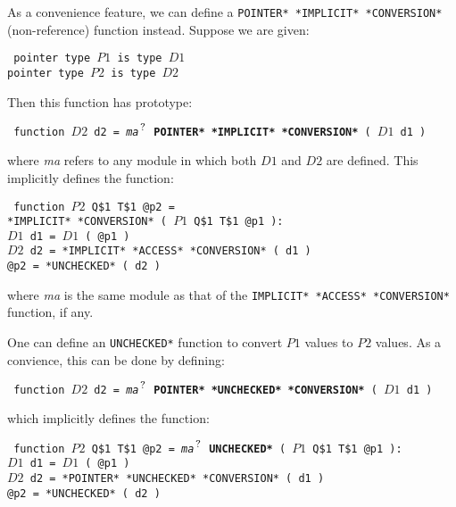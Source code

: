 \documentclass[12pt]{article}
\newcommand{\QMARK}{{$^{\,\mbox{\footnotesize ?}}$}}
\newcommand{\ttkey}[1]{{\tt \bfseries #1}}
\newenvironment{indpar}[1][0.3in]%
	{\begin{list}{}%
		     {\setlength{\itemsep}{0in}%
		      \setlength{\topsep}{0in}%
		      \setlength{\parsep}{1ex}%
		      \setlength{\labelwidth}{#1}%
		      \setlength{\leftmargin}{#1}%
		      \addtolength{\leftmargin}{\labelsep}}%
	 \item}%
	{\end{list}}
\begin{document}
As a convenience feature, we can define a
{\tt *POINTER* *IMPLICIT* *CONVERSION*} (non-reference) function instead.
 Suppose we are given:
\begin{indpar} \tt
pointer type $P1$ is type $D1$ \\
pointer type $P2$ is type $D2$
\end{indpar}
Then this function has prototype:
\begin{indpar}\label{POINTER-IMPLICIT-CONVERSION} \tt
function $D2$ d2 = {\em ma}\QMARK{} \ttkey{*POINTER* *IMPLICIT* *CONVERSION*}
                  ( $D1$ d1 )
\end{indpar}
where {\em ma} refers to any module in which both $D1$ and $D2$ are defined.
This implicitly defines the function:
\begin{indpar} \tt
function $P2$ Q\$1 T\$1 @p2 = \\
\hspace*{1in}{\em ma}\QMARK{} *IMPLICIT* *CONVERSION* ( $P1$ Q\$1 T\$1 @p1 ): \\
\hspace*{0.3in}$D1$ d1 = $D1$ ( @p1 ) \\
\hspace*{0.3in}$D2$ d2 = *IMPLICIT* *ACCESS* *CONVERSION* ( d1 ) \\
\hspace*{0.3in}@p2 = *UNCHECKED* ( d2 )
\end{indpar}
where {\em ma} is the same module as that of the
{\tt *IMPLICIT* *ACCESS* *CONVERSION*} function, if any.

One can define an {\tt *UNCHECKED*} function to convert
$P1$ values to $P2$ values.  As a convience, this can be
done by defining:
\begin{indpar} \tt
function $D2$ d2 = {\em ma}\QMARK{}  \ttkey{*POINTER* *UNCHECKED* *CONVERSION*}
			( $D1$ d1 )
\end{indpar}
which implicitly defines the function:
\begin{indpar} \tt
function $P2$ Q\$1 T\$1 @p2 = {\em ma}\QMARK{} \ttkey{*UNCHECKED*}
	( $P1$ Q\$1 T\$1 @p1 ): \\
\hspace*{0.3in}$D1$ d1 = $D1$ ( @p1 ) \\
\hspace*{0.3in}$D2$ d2 = *POINTER* *UNCHECKED* *CONVERSION* ( d1 ) \\
\hspace*{0.3in}@p2 = *UNCHECKED* ( d2 )
\end{indpar}
\end{document}
